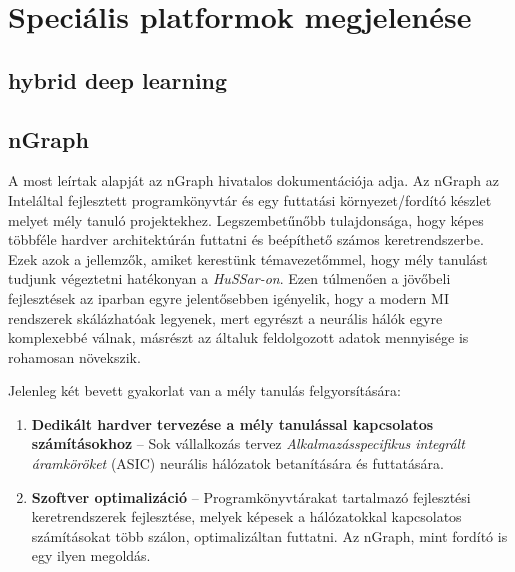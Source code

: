 \chapter{Speciális platformok megjelenése}
\section{hybrid deep learning}

\section{nGraph}
A most leírtak alapját az nGraph hivatalos dokumentációja adja\cite{web:ngraph_intro}.
Az nGraph az Intel\registeredlogo által fejlesztett programkönyvtár és egy futtatási környezet/fordító készlet melyet mély tanuló projektekhez.
Legszembetűnőbb tulajdonsága, hogy képes többféle hardver architektúrán futtatni és beépíthető számos keretrendszerbe.
Ezek azok a jellemzők, amiket kerestünk témavezetőmmel, hogy mély tanulást tudjunk végeztetni hatékonyan a \emph{HuSSar-on}. 
Ezen túlmenően a jövőbeli fejlesztések az iparban egyre jelentősebben igényelik, hogy a modern MI rendszerek skálázhatóak legyenek, mert egyrészt a neurális hálók egyre komplexebbé válnak, másrészt az általuk feldolgozott adatok mennyisége is rohamosan növekszik.

Jelenleg két bevett gyakorlat van a mély tanulás felgyorsítására:
\begin{enumerate}
	\item \textbf{Dedikált hardver tervezése a mély tanulással kapcsolatos számításokhoz} -- Sok vállalkozás tervez \emph{Alkalmazásspecifikus integrált áramköröket} (ASIC) neurális hálózatok betanítására és futtatására.
	\item \textbf{Szoftver optimalizáció} -- Programkönyvtárakat tartalmazó fejlesztési keretrendszerek fejlesztése, melyek képesek a hálózatokkal kapcsolatos számításokat több szálon, optimalizáltan futtatni. Az nGraph, mint fordító is egy ilyen megoldás.
\end{enumerate}

